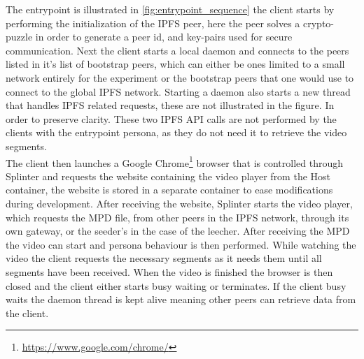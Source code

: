 The entrypoint is illustrated in \ref{fig:entrypoint_sequence} the client starts by performing the initialization of the IPFS peer, here the peer solves a crypto-puzzle in order to generate a peer id, and key-pairs used for secure communication.
Next the client starts a local daemon and connects to the peers listed in it's list of bootstrap peers, which can either be ones limited to a small network entirely for the experiment or the bootstrap peers that one would use to connect to the global \acs{IPFS} network.
Starting a daemon also starts a new thread that handles \acs{IPFS} related requests, these are not illustrated in the figure. In order to preserve clarity. These two \acs{IPFS} \acs{API} calls are not performed by the clients with the entrypoint persona, as they do not need it to retrieve the video segments.\\
The client then launches a Google Chrome\footnote{\url{https://www.google.com/chrome/}} browser that is controlled through Splinter and requests the website containing the video player from the Host container, the website is stored in a separate container to ease modifications during development.
After receiving the website, Splinter starts the video player, which requests the \acs{MPD} file, from other peers in the \acs{IPFS} network, through its own gateway, or the seeder's in the case of the leecher.
After receiving the \acs{MPD} the video can start and persona behaviour is then performed. While watching the video the client requests the necessary segments as it needs them until all segments have been received.
When the video is finished the browser is then closed and the client either starts busy waiting or terminates. If the client busy waits the daemon thread is kept alive meaning other peers can retrieve data from the client.\\



